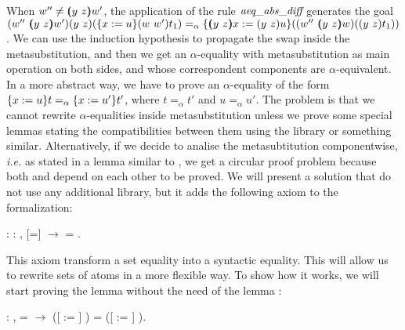 \begin{coqdoccode}
\end{coqdoccode}
When $w'' \neq \vswap{y}{z}{w'}$, the application of the rule $\mbox{\it aeq}\_\mbox{\it abs}\_\mbox{\it diff}$ generates the goal $\swap{w''}{\vswap{y}{z}{w'}}{\swap{y}{z}{(\metasub{\swap{w}{w'}{t_1}}{x}{u})}} =_\alpha \metasub{(\swap{w''}{\vswap{y}{z}{w}}{(\swap{y}{z}{t_1})})}{\vswap{y}{z}{x}}{\swap{y}{z}{u}}$. We can use the induction hypothesis to propagate the swap inside the metasubstitution, and then we get an $\alpha$-equality with metasubstitution as main operation on both sides, and whose correspondent components are $\alpha$-equivalent. In a more abstract way, we have to prove an $\alpha$-equality of the form $\metasub{t}{x}{u} =_\alpha \metasub{t'}{x}{u'}$, where $t =_\alpha t'$ and $u =_\alpha u'$. The problem is that we cannot rewrite $\alpha$-equalities inside metasubstitution unless we prove some special lemmas stating the compatibilities between them using the  library or something similar. Alternatively, if we decide to analise the metasubtitution componentwise, {\it i.e.} as stated in a lemma similar to , we get a circular proof problem because both  and  depend on each other to be proved. We will present a solution that do not use any additional library, but it adds the following axiom to the formalization:
\begin{coqdoccode}
\coqdocemptyline
\coqdocnoindent
{} : \coqdockw{\ensuremath{\forall}}  : ,  [=]  \ensuremath{\rightarrow}  = .\coqdoceol
\coqdocemptyline
\end{coqdoccode}
This axiom transform a set equality into a syntactic equality. This will allow us to rewrite sets of atoms in a more flexible way. To show how it works, we will start proving the lemma  without the need of the lemma :
\begin{coqdoccode}
\coqdocemptyline
\coqdocnoindent
{} : \coqdockw{\ensuremath{\forall}}    ,  =  \ensuremath{\rightarrow} ([ := ] ) = ([ := ] ).\coqdoceol
\end{coqdoccode}
